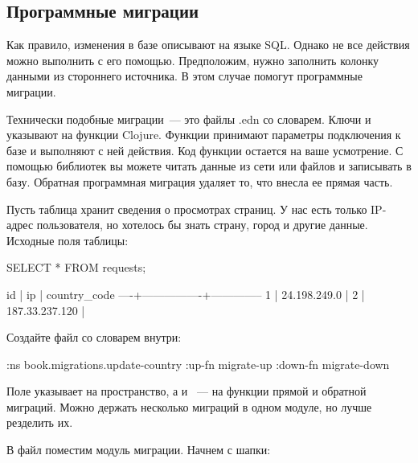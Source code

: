 \subsection{Программные миграции}

Как правило, изменения в базе описывают на языке SQL. Однако не все действия можно выполнить с его помощью. Предположим, нужно заполнить колонку данными из стороннего источника. В этом случае помогут программные миграции.

Технически подобные миграции~--- это файлы .edn со словарем. Ключи  и  указывают на функции Clojure. Функции принимают параметры подключения к базе и выполняют с ней действия. Код функции остается на ваше усмотрение. С помощью библиотек вы можете читать данные из сети или файлов и записывать в базу. Обратная программная миграция удаляет то, что внесла ее прямая часть.

Пусть таблица  хранит сведения о просмотрах страниц. У нас есть только IP-адрес пользователя, но хотелось бы знать страну, город и другие данные. Исходные поля таблицы:

\begin{english}
  \begin{sql}
SELECT * FROM requests;
  \end{sql}
\end{english}

\begin{english}
  \begin{text}
 id |       ip       | country_code
----+----------------+--------------
  1 | 24.198.249.0   |
  2 | 187.33.237.120 |
  \end{text}
\end{english}


Создайте файл  со словарем внутри:

\begin{english}
  \begin{clojure}
{:ns book.migrations.update-country
 :up-fn migrate-up
 :down-fn migrate-down}
  \end{clojure}
\end{english}

Поле  указывает на пространство, а  и ~--- на функции прямой и обратной миграций. Можно держать несколько миграций в одном модуле, но лучше резделить их.

В файл  поместим модуль миграции. Начнем с шапки:

